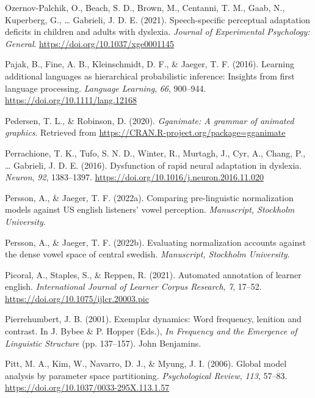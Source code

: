 \documentclass[
  11pt,
  english,
  man,floatsintext]{apa6}
\newlength{\cslhangindent}
\newlength{\cslentryspacingunit} %
\newenvironment{CSLReferences}[2] %
 {%
  \setlength{\parindent}{0pt}
  \ifodd #1
  \let\oldpar\par
  \def\par{\hangindent=\cslhangindent\oldpar}
  \fi
  \setlength{\parskip}{#2\cslentryspacingunit}
 }%
 {}
\begin{document}
\begin{CSLReferences}{1}{0}
\leavevmode{}%
Ozernov-Palchik, O., Beach, S. D., Brown, M., Centanni, T. M., Gaab, N., Kuperberg, G., \ldots{} Gabrieli, J. D. E. (2021). Speech-specific perceptual adaptation deficits in children and adults with dyslexia. \emph{Journal of Experimental Psychology: General}. \url{https://doi.org/10.1037/xge0001145}

\leavevmode{}%
Pajak, B., Fine, A. B., Kleinschmidt, D. F., \& Jaeger, T. F. (2016). Learning additional languages as hierarchical probabilistic inference: Insights from first language processing. \emph{Language Learning}, \emph{66}, 900--944. \url{https://doi.org/10.1111/lang.12168}

\leavevmode{}%
Pedersen, T. L., \& Robinson, D. (2020). \emph{Gganimate: A grammar of animated graphics}. Retrieved from \url{https://CRAN.R-project.org/package=gganimate}

\leavevmode{}%
Perrachione, T. K., Tufo, S. N. D., Winter, R., Murtagh, J., Cyr, A., Chang, P., \ldots{} Gabrieli, J. D. E. (2016). Dysfunction of rapid neural adaptation in dyslexia. \emph{Neuron}, \emph{92}, 1383--1397. \url{https://doi.org/10.1016/j.neuron.2016.11.020}

\leavevmode{}%
Persson, A., \& Jaeger, T. F. (2022a). Comparing pre-linguistic normalization models against US english listeners' vowel perception. \emph{Manuscript, Stockholm University}.

\leavevmode{}%
Persson, A., \& Jaeger, T. F. (2022b). Evaluating normalization accounts against the dense vowel space of central swedish. \emph{Manuscript, Stockholm University}.

\leavevmode{}%
Picoral, A., Staples, S., \& Reppen, R. (2021). Automated annotation of learner english. \emph{International Journal of Learner Corpus Research}, \emph{7}, 17--52. \url{https://doi.org/10.1075/ijlcr.20003.pic}

\leavevmode{}%
Pierrehumbert, J. B. (2001). Exemplar dynamics: Word frequency, lenition and contrast. In J. Bybee \& P. Hopper (Eds.), \emph{In Frequency and the Emergence of Linguistic Structure} (pp. 137--157). John Benjamins.

\leavevmode{}%
Pitt, M. A., Kim, W., Navarro, D. J., \& Myung, J. I. (2006). Global model analysis by parameter space partitioning. \emph{Psychological Review}, \emph{113}, 57--83. \url{https://doi.org/10.1037/0033-295X.113.1.57}


\end{CSLReferences}
\end{document}
